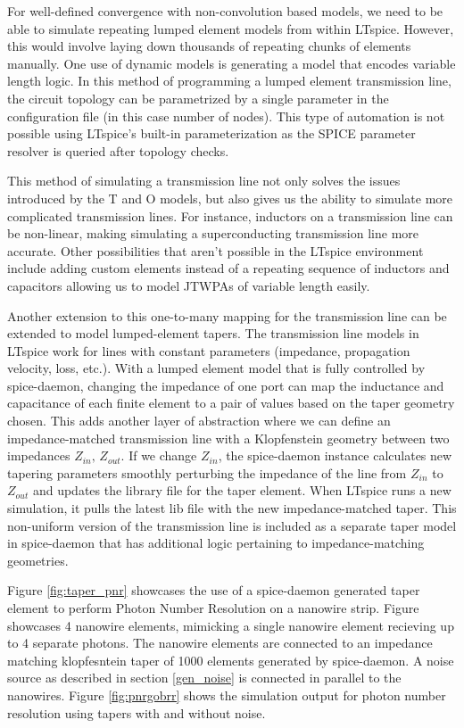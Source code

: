 For well-defined convergence with non-convolution based models, we need to be able to simulate repeating
lumped element models from within LTspice. 
However, this would involve laying down thousands 
of repeating chunks of elements manually. One use of dynamic models is generating a model 
that encodes variable length logic. In this method of programming a lumped element transmission
line, the circuit topology can be parametrized by a single parameter in the configuration file 
(in this case number of nodes). This type of automation is not possible using LTspice's built-in
parameterization as the SPICE parameter resolver is queried after topology checks.

This method of simulating a transmission line not only solves the issues introduced by the
T and O models, but also gives us the ability to simulate more complicated transmission lines.
For instance, inductors on a transmission line can be non-linear, making simulating a superconducting
transmission line more accurate. Other possibilities that aren't possible in the LTspice environment
include adding custom elements instead of a repeating sequence of inductors and capacitors allowing us to
model JTWPAs of variable length easily.

Another extension to this one-to-many mapping for the transmission line can be extended to model
lumped-element tapers. The transmission line models in LTspice work for lines with constant 
parameters (impedance, propagation velocity, loss, etc.). With a lumped element model that is fully
controlled by spice-daemon, changing the impedance of one port can map the inductance and capacitance
of each finite element to a pair of values based on the taper geometry chosen. This adds another layer
of abstraction where we can define an impedance-matched transmission line with a Klopfenstein geometry
between two impedances $Z_{in},\, Z_{out}$. If we change $Z_{in}$, the spice-daemon instance calculates
new tapering parameters smoothly perturbing the impedance of the line from $Z_{in}$ to $Z_{out}$ and
updates the library file for the taper element. 
When LTspice runs a new simulation, it pulls the latest
lib file with the new impedance-matched taper. This non-uniform version of the transmission line
is included as a separate taper model in spice-daemon that has additional logic pertaining to 
impedance-matching geometries.

Figure \ref{fig:taper_pnr} showcases the use of a spice-daemon generated
taper element to perform Photon Number Resolution on a nanowire strip. 
Figure \label{fig:taper_circ} showcases 4 nanowire elements, mimicking
a single nanowire element recieving up to 4 separate photons. The nanowire
elements are connected to an impedance matching klopfesntein taper of 1000
elements generated by spice-daemon. A noise source as described in section
\ref{gen_noise} is connected in parallel to the nanowires. Figure \ref{fig:pnrgobrr}
shows the simulation output for photon number resolution using tapers with 
and without noise.


